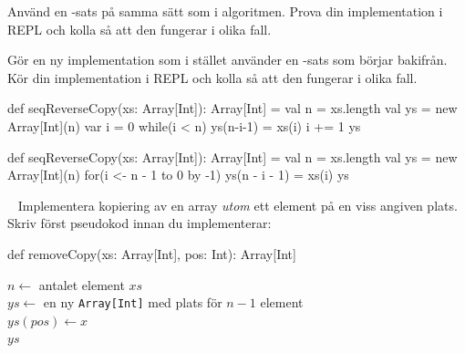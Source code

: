\Subtask Använd en -sats på samma sätt som i algoritmen. Prova din implementation i REPL och kolla så att den fungerar i olika fall.

\Subtask Gör en ny implementation som i stället använder en -sats som börjar bakifrån. Kör din implementation i REPL och kolla så att den fungerar i olika fall.

\SOLUTION

\TaskSolved \what

\SubtaskSolved  \begin{Code}
def seqReverseCopy(xs: Array[Int]): Array[Int] = {
  val n = xs.length
  val ys = new Array[Int](n)
  var i = 0
  while(i < n) {
    ys(n-i-1) = xs(i)
    i += 1
  }
  ys
}
\end{Code}

\SubtaskSolved  \begin{Code}
def seqReverseCopy(xs: Array[Int]): Array[Int] = {
  val n = xs.length
  val ys = new Array[Int](n)
  for(i <- n - 1 to 0 by -1) ys(n - i - 1) = xs(i)
  ys
}
\end{Code}


\QUESTEND





\QUESTBEGIN

\Task  \what~  Implementera kopiering av en array \emph{utom} ett element på en viss angiven plats.
Skriv först pseudokod innan du implementerar:
\begin{Code}
def removeCopy(xs: Array[Int], pos: Int): Array[Int]
\end{Code}

\SOLUTION


\TaskSolved \what

\begin{algorithm}[H]

 $n \leftarrow$ antalet element $xs$\\
 $ys \leftarrow$ en ny \texttt{Array[Int]} med plats för $n-1$ element \\
 $ys(pos) \leftarrow x$ \\
 \Return $ys$
\end{algorithm}

